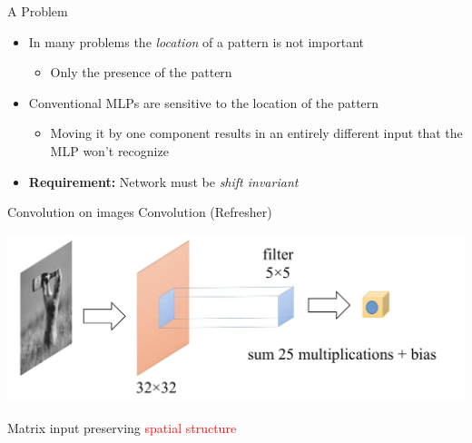 \documentclass[serif, aspectratio=169]{beamer}
\begin{document}
	\begin{frame}{A Problem}
		\begin{itemize}
			\item In many problems the \textit{location} of a pattern is not important
			\begin{itemize}
				\item Only the presence of the pattern
			\end{itemize}
			\item Conventional MLPs are sensitive to the location of the pattern
			\begin{itemize}
				\item Moving it by one component results in an entirely different input that the MLP won’t recognize
			\end{itemize}
			
			\item \textbf{Requirement:} Network must be \textit{shift invariant}
		\end{itemize}
	\end{frame}
	\begin{frame}{Convolution on images}
		Convolution (Refresher)
		\begin{center}
			\includegraphics[keepaspectratio, scale=0.2]{pic/conv.jpg}
			
			Matrix input preserving \textcolor{red}{spatial structure}
		\end{center}

	\end{frame}
\end{document}
